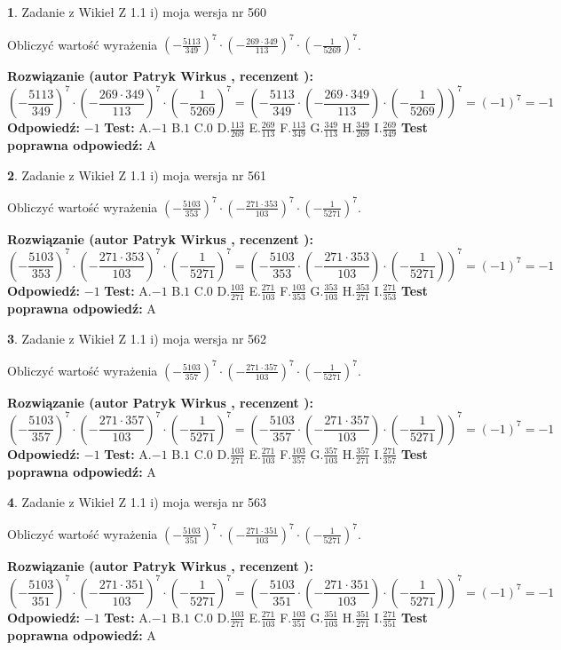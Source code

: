 \documentclass[12pt, a4paper]{article}
\theoremstyle{definition} %
\newtheorem{zad}{}
\newcommand{\zadStart}[1]{\begin{zad}#1\newline}
\newcommand{\zadStop}{\end{zad}}
\newcommand{\rozwStart}[2]{\noindent \textbf{Rozwiązanie (autor #1 , recenzent #2): }\newline}
\newcommand{\rozwStop}{\newline}
\newcommand{\odpStart}{\noindent \textbf{Odpowiedź:}\newline}
\newcommand{\odpStop}{\newline}
\newcommand{\testStart}{\noindent \textbf{Test:}\newline}
\newcommand{\testStop}{\newline}
\newcommand{\kluczStart}{\noindent \textbf{Test poprawna odpowiedź:}\newline}
\newcommand{\kluczStop}{\newline}
\begin{document}
\zadStart{Zadanie z Wikieł Z 1.1 i) moja wersja nr 560}

Obliczyć wartość wyrażenia $(-\frac{5113}{349})^{7} \cdot (-\frac{269 \cdot 349}{113})^{7} \cdot (-\frac{1}{5269})^{7}$.
\zadStop
\rozwStart{Patryk Wirkus}{}
$$(-\frac{5113}{349})^{7} \cdot (-\frac{269 \cdot 349}{113})^{7} \cdot (-\frac{1}{5269})^{7} = (-\frac{5113}{349} \cdot (-\frac{269 \cdot 349}{113}) \cdot (-\frac{1}{5269}))^{7} = (-1)^{7} = -1$$
\rozwStop
\odpStart
$-1$
\odpStop
\testStart
A.$-1$ B.$1$ C.$0$ D.$\frac{113}{269}$ E.$\frac{269}{113}$
F.$\frac{113}{349}$ G.$\frac{349}{113}$
H.$\frac{349}{269}$
I.$\frac{269}{349}$
\testStop
\kluczStart
A
\kluczStop



\zadStart{Zadanie z Wikieł Z 1.1 i) moja wersja nr 561}

Obliczyć wartość wyrażenia $(-\frac{5103}{353})^{7} \cdot (-\frac{271 \cdot 353}{103})^{7} \cdot (-\frac{1}{5271})^{7}$.
\zadStop
\rozwStart{Patryk Wirkus}{}
$$(-\frac{5103}{353})^{7} \cdot (-\frac{271 \cdot 353}{103})^{7} \cdot (-\frac{1}{5271})^{7} = (-\frac{5103}{353} \cdot (-\frac{271 \cdot 353}{103}) \cdot (-\frac{1}{5271}))^{7} = (-1)^{7} = -1$$
\rozwStop
\odpStart
$-1$
\odpStop
\testStart
A.$-1$ B.$1$ C.$0$ D.$\frac{103}{271}$ E.$\frac{271}{103}$
F.$\frac{103}{353}$ G.$\frac{353}{103}$
H.$\frac{353}{271}$
I.$\frac{271}{353}$
\testStop
\kluczStart
A
\kluczStop



\zadStart{Zadanie z Wikieł Z 1.1 i) moja wersja nr 562}

Obliczyć wartość wyrażenia $(-\frac{5103}{357})^{7} \cdot (-\frac{271 \cdot 357}{103})^{7} \cdot (-\frac{1}{5271})^{7}$.
\zadStop
\rozwStart{Patryk Wirkus}{}
$$(-\frac{5103}{357})^{7} \cdot (-\frac{271 \cdot 357}{103})^{7} \cdot (-\frac{1}{5271})^{7} = (-\frac{5103}{357} \cdot (-\frac{271 \cdot 357}{103}) \cdot (-\frac{1}{5271}))^{7} = (-1)^{7} = -1$$
\rozwStop
\odpStart
$-1$
\odpStop
\testStart
A.$-1$ B.$1$ C.$0$ D.$\frac{103}{271}$ E.$\frac{271}{103}$
F.$\frac{103}{357}$ G.$\frac{357}{103}$
H.$\frac{357}{271}$
I.$\frac{271}{357}$
\testStop
\kluczStart
A
\kluczStop



\zadStart{Zadanie z Wikieł Z 1.1 i) moja wersja nr 563}

Obliczyć wartość wyrażenia $(-\frac{5103}{351})^{7} \cdot (-\frac{271 \cdot 351}{103})^{7} \cdot (-\frac{1}{5271})^{7}$.
\zadStop
\rozwStart{Patryk Wirkus}{}
$$(-\frac{5103}{351})^{7} \cdot (-\frac{271 \cdot 351}{103})^{7} \cdot (-\frac{1}{5271})^{7} = (-\frac{5103}{351} \cdot (-\frac{271 \cdot 351}{103}) \cdot (-\frac{1}{5271}))^{7} = (-1)^{7} = -1$$
\rozwStop
\odpStart
$-1$
\odpStop
\testStart
A.$-1$ B.$1$ C.$0$ D.$\frac{103}{271}$ E.$\frac{271}{103}$
F.$\frac{103}{351}$ G.$\frac{351}{103}$
H.$\frac{351}{271}$
I.$\frac{271}{351}$
\testStop
\kluczStart
A
\kluczStop
\end{document}

